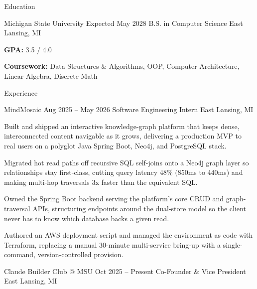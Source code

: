 \documentclass[
	11pt
]{../../../template}
\begin{document}
	\begin{rSection}{E}{ducation}
		\begin{rSectionEntry}
			{Michigan State University}
			{Expected May 2028}
			{B.S. in Computer Science}
			{}
			{East Lansing, MI}

			\item \textbf{GPA:} 3.5 / 4.0
			\item \textbf{Coursework:} Data Structures \& Algorithms, OOP, Computer Architecture, Linear Algebra, Discrete Math
		\end{rSectionEntry}
	\end{rSection}

	\begin{rSection}{E}{xperience}
		\begin{rSectionEntry}
			{MindMosaic}
			{Aug 2025 -- May 2026}
			{Software Engineering Intern}
			{}
			{East Lansing, MI}

			\item Built and shipped an interactive knowledge-graph platform that keeps dense, interconnected content navigable as it grows, delivering a production MVP to real users on a polyglot Java Spring Boot, Neo4j, and PostgreSQL stack.
			\item Migrated hot read paths off recursive SQL self-joins onto a Neo4j graph layer so relationships stay first-class, cutting query latency 48\% (850ms to 440ms) and making multi-hop traversals 3x faster than the equivalent SQL.
			\item Owned the Spring Boot backend serving the platform's core CRUD and graph-traversal APIs, structuring endpoints around the dual-store model so the client never has to know which database backs a given read.
			\item Authored an AWS deployment script and managed the environment as code with Terraform, replacing a manual 30-minute multi-service bring-up with a single-command, version-controlled provision.
		\end{rSectionEntry}

		\begin{rSectionEntry}
			{Claude Builder Club @ MSU}
			{Oct 2025 -- Present}
			{Co-Founder \& Vice President}
			{}
			{East Lansing, MI}


\end{rSectionEntry}
\end{rSection}
\end{document}

